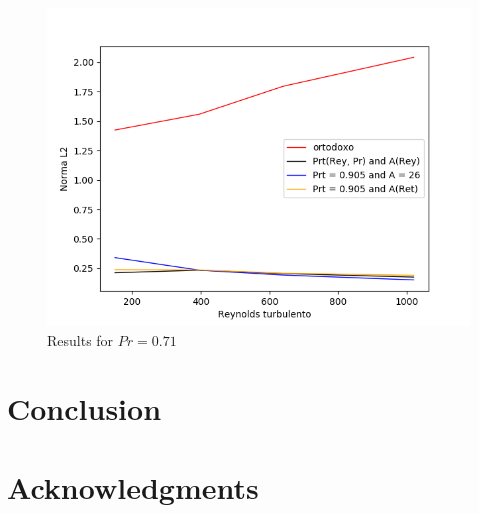 \documentclass[10pt]{article} %
\begin{document}
\begin{figure}[!h]
	\centering
	\includegraphics[angle=0, scale=0.59]{finaisRey}
	\caption{Results for $Pr = 0.71$}
\end{figure}

\section{Conclusion}

\section{Acknowledgments}
\end{document}
